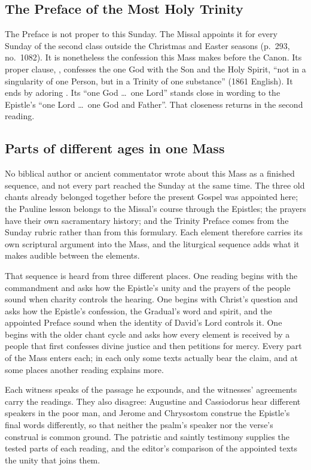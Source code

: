 \subsection{The Preface of the Most Holy Trinity}

The Preface is not proper to this Sunday. The Missal appoints it for every
Sunday of the second class outside the Christmas and Easter seasons (p.~293,
no.~1082). It is nonetheless the confession this Mass makes before the Canon.
Its proper clause, , confesses the one God with the Son and the Holy
Spirit, ``not in a singularity of one Person, but in a Trinity of one
substance'' (1861 English). It ends by adoring . Its
``one God \dots\ one Lord'' stands close in wording to the Epistle's ``one
Lord \dots\ one God and Father''. That closeness returns in the second reading.

\subsection{Parts of different ages in one Mass}

No biblical author or ancient commentator wrote about this Mass as a finished
sequence, and not every part reached the Sunday at the same time. The three old chants already belonged together before
the present Gospel was appointed here; the Pauline lesson belongs to the
Missal's course through the Epistles; the prayers have their own sacramentary
history; and the Trinity Preface comes from the Sunday rubric rather than from
this formulary. Each element therefore carries its own scriptural argument
into the Mass, and the liturgical sequence adds what it makes audible between
the elements.

That sequence is heard from three different places. One reading begins
with the commandment and asks how the Epistle's unity and the prayers of the
people sound when charity controls the hearing. One begins with Christ's
question and asks how the Epistle's confession, the Gradual's word and
spirit, and the appointed Preface sound when the identity of David's Lord
controls it. One begins with the older chant cycle and asks how every element
is received by a people that first confesses divine justice and then petitions
for mercy. Every part of the Mass enters each; in each only some texts
actually bear the claim, and at some places another reading explains more.

Each witness speaks of the passage he expounds, and the witnesses' agreements
carry the readings. They also disagree: Augustine and Cassiodorus hear
different speakers in the poor man, and Jerome and Chrysostom construe the
Epistle's final words differently, so that neither the psalm's speaker nor
the verse's construal is common ground. The patristic and saintly testimony
supplies the tested parts of each reading, and the editor's comparison of the
appointed texts the unity that joins them.
